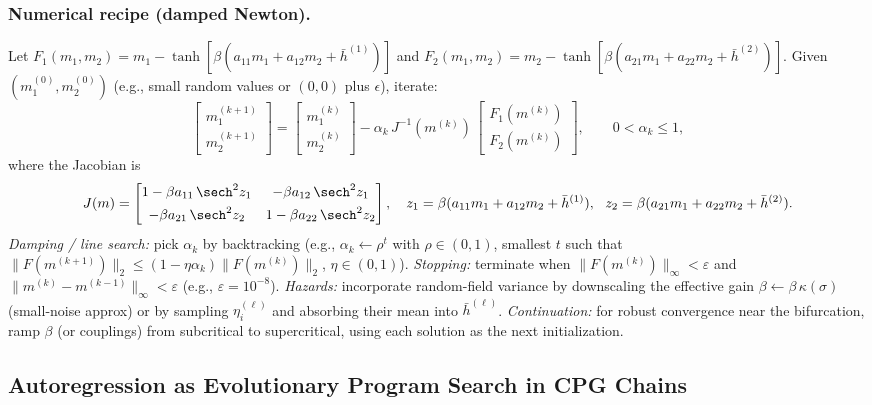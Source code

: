 \documentclass[a4paper,11pt]{article}
\begin{document}
\subsubsection{Numerical recipe (damped Newton).}
Let $F_1(m_1,m_2)=m_1-\tanh[\beta(a_{11}m_1+a_{12}m_2+\bar h^{(1)})]$ and
$F_2(m_1,m_2)=m_2-\tanh[\beta(a_{21}m_1+a_{22}m_2+\bar h^{(2)})]$.
Given $(m_1^{(0)},m_2^{(0)})$ (e.g., small random values or $(0,0)$ plus $\epsilon$), iterate:
\begin{equation}
\begin{bmatrix} m_1^{(k+1)} \\[2pt] m_2^{(k+1)} \end{bmatrix}
=
\begin{bmatrix} m_1^{(k)} \\[2pt] m_2^{(k)} \end{bmatrix}
-\alpha_k\, J^{-1}(m^{(k)})\,
\begin{bmatrix} F_1(m^{(k)}) \\[2pt] F_2(m^{(k)}) \end{bmatrix},
\qquad 0<\alpha_k\le 1,
\end{equation}
where the Jacobian is
\begin{equation}
J(m)=
\begin{bmatrix}
1-\beta a_{11}\,\sech^2 z_1 & -\beta a_{12}\,\sech^2 z_1\\[4pt]
-\beta a_{21}\,\sech^2 z_2 & 1-\beta a_{22}\,\sech^2 z_2
\end{bmatrix},
\quad
z_1=\beta(a_{11}m_1+a_{12}m_2+\bar h^{(1)}),\ \
z_2=\beta(a_{21}m_1+a_{22}m_2+\bar h^{(2)}).
\end{equation}
\emph{Damping / line search:} pick $\alpha_k$ by backtracking (e.g., $\alpha_k\!\leftarrow\! \rho^t$ with $\rho\!\in\!(0,1)$, smallest $t$ such that
$\|F(m^{(k+1)})\|_2 \le (1-\eta\alpha_k)\|F(m^{(k)})\|_2$, $\eta\!\in\!(0,1)$).
\emph{Stopping:} terminate when $\|F(m^{(k)})\|_\infty<\varepsilon$ and $\|m^{(k)}-m^{(k-1)}\|_\infty<\varepsilon$ (e.g., $\varepsilon=10^{-8}$).
\emph{Hazards:} incorporate random-field variance by downscaling the effective gain
$\beta\leftarrow\beta\,\kappa(\sigma)$ (small-noise approx) or by sampling $\eta_i^{(\ell)}$ and absorbing their mean into $\bar h^{(\ell)}$.
\emph{Continuation:} for robust convergence near the bifurcation, ramp $\beta$ (or couplings) from subcritical to supercritical, using each solution as the next initialization.

\subsection{Autoregression as Evolutionary Program Search in CPG Chains}
\end{document}
